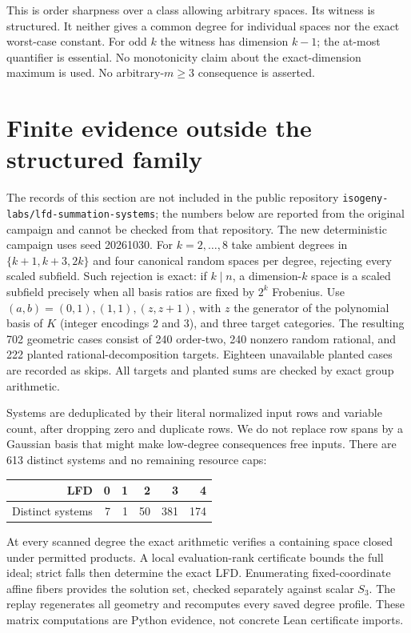 \documentclass[11pt]{article}
\theoremstyle{remark}\newtheorem{remark}[theorem]{Remark}
\begin{document}
This is order sharpness over a class allowing arbitrary spaces. Its witness
is structured. It neither gives a common degree for individual spaces nor
the exact worst-case constant. For odd $k$ the witness has dimension $k-1$;
the at-most quantifier is essential. No monotonicity claim about the
exact-dimension maximum is used. No arbitrary-$m\ge3$ consequence is asserted.

\section{Finite evidence outside the structured family}
The records of this section are not included in the public repository \texttt{isogeny-labs/\allowbreak lfd-summation-systems}; the numbers below are reported from the original campaign and cannot be checked from that repository. The new deterministic campaign uses seed 20261030. For $k=2,\ldots,8$ take
ambient degrees in $\{k+1,k+3,2k\}$ and four canonical random spaces per
degree, rejecting every scaled subfield. Such rejection is exact: if $k\mid n$,
a dimension-$k$ space is a scaled subfield precisely when all basis ratios
are fixed by $2^k$ Frobenius. Use $(a,b)=(0,1),(1,1),(z,z+1)$, with $z$ the generator of the polynomial basis of $K$ (integer encodings $2$ and $3$), and three target categories. The resulting 702 geometric cases consist of 240
order-two, 240 nonzero random rational, and 222 planted rational-decomposition
targets. Eighteen unavailable planted cases are recorded as skips.
All targets and planted sums are checked by exact group arithmetic.

Systems are deduplicated by their literal normalized input rows and variable
count, after dropping zero and duplicate rows. We do not replace row spans
by a Gaussian basis that might make low-degree consequences free inputs.
There are 613 distinct systems and no remaining resource caps:
\begin{center}
\begin{tabular}{rrrrrr}\toprule
LFD &0&1&2&3&4\\\midrule
Distinct systems&7&1&50&381&174\\\bottomrule
\end{tabular}
\end{center}
At every scanned degree the exact arithmetic verifies a containing space
closed under permitted products. A local evaluation-rank certificate bounds
the full ideal; strict falls then determine the exact LFD. Enumerating
fixed-coordinate affine fibers provides the solution set, checked separately
against scalar $S_3$. The replay regenerates all geometry and recomputes
every saved degree profile. These matrix computations are Python evidence,
not concrete Lean certificate imports.
\end{document}
